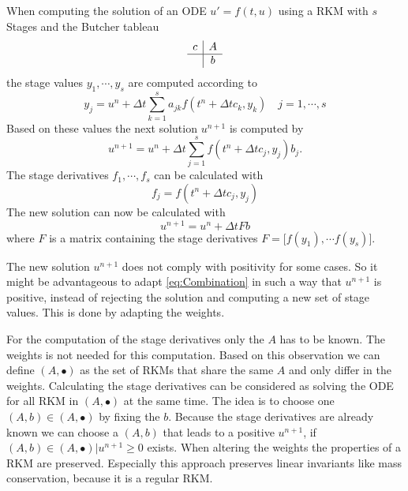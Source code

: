 \documentclass[a4paper]{scrartcl}
\numberwithin{equation}{section}
\theoremstyle{plain}
\theoremstyle{definition}
\numberwithin{theorem}{section}
\newcommand{\dt}{{\Delta t}}
\newcommand{\1}{\mathbbm{1}}
\begin{document}
When computing the solution of an ODE $u ' = f(t,u) $ using a RKM with $s$ Stages and the Butcher tableau
\begin{align}
\begin{array}{c|c}
c &  A \\
\hline
 & b\\
\end{array}
\end{align}
the stage values $y_1,\cdots,y_s$ are computed according to
\begin{equation}
y_j =  u^n + \dt \sum_{k = 1}^{s} a_{jk} f(t^n + \dt c_k,y_k)  \quad j = 1,\cdots,s
\end{equation}
Based on these values the next solution $u^{n+1}$ is computed by
\begin{equation}
u^{n+1} = u^n + \dt \sum_{j  = 1}^s f(t^n + \dt c_j,y_j) b_j .
\end{equation}
The stage derivatives $f_1,\cdots,f_s$ can be calculated with
\begin{equation}
f_j = f(t^n + \dt c_j,y_j)
\end{equation}
The new solution can now be calculated with
\begin{equation}\label{eq:Combination}
u^{n+1} = u^n + \dt F b
\end{equation}
where $F$ is a matrix containing the stage derivatives $F = \big[f(y_1) , \cdots f(y_s)\big]$.

The new solution $u^{n+1}$ does not comply with positivity for some cases. 
So it might be advantageous to adapt \eqref{eq:Combination} in such a way that $u^{n+1}$ is positive, instead of rejecting the solution and computing a new set of stage values. This is done by adapting the weights.




For the computation of the stage derivatives only the $A$ has to be known. The weights is not needed for this computation. 
Based on this observation we can define $(A,\bullet)$ as the set of RKMs that share the same $A$ and only differ in the weights.
Calculating the stage derivatives can be considered as solving the ODE for all RKM in $(A,\bullet)$ at the same time.
The idea is to choose one $(A,b) \in (A,\bullet)$ by fixing the $b$. 
Because the stage derivatives are already known we can choose a $(A,b)$ that leads to a positive $u^{n+1}$, if $(A,b) \in (A,\bullet) | u^{n+1} \geq 0$ exists.
When altering the weights the properties of a RKM are preserved. 
Especially this approach preserves linear invariants like mass conservation, because it is a regular RKM. 
\end{document}
